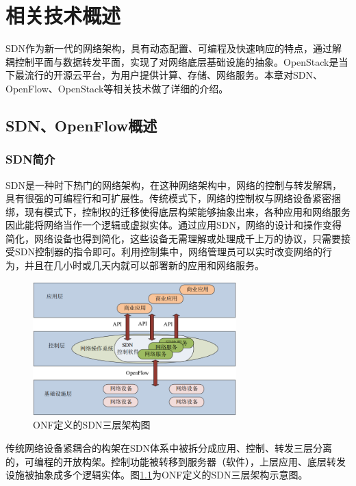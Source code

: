 
\chapter{相关技术概述}
SDN作为新一代的网络架构，具有动态配置、可编程及快速响应的特点，通过解耦控制平面与数据转发平面，实现了对网络底层基础设施的抽象。OpenStack是当下最流行的开源云平台，为用户提供计算、存储、网络服务。本章对SDN、OpenFlow、OpenStack等相关技术做了详细的介绍。
\section{SDN、OpenFlow概述}
\subsection{SDN简介}
SDN是一种时下热门的网络架构，在这种网络架构中，网络的控制与转发解耦，具有很强的可编程行和可扩展性。传统模式下，网络的控制权与网络设备紧密捆绑，现有模式下，控制权的迁移使得底层构架能够抽象出来，各种应用和网络服务因此能将网络当作一个逻辑或虚拟实体。通过应用SDN，网络的设计和操作变得简化，网络设备也得到简化，这些设备无需理解或处理成千上万的协议，只需要接受SDN控制器的指令即可。利用控制集中，网络管理员可以实时改变网络的行为，并且在几小时或几天内就可以部署新的应用和网络服务。

\begin{figure}[!htb]
  \centering
  \includegraphics[width=0.7\textwidth]{logo/sdn.png}
  \caption{ONF定义的SDN三层架构图}
  \label{fig:sdn}
\end{figure}

传统网络设备紧耦合的构架在SDN体系中被拆分成应用、控制、转发三层分离的，可编程的开放构架。控制功能被转移到服务器（软件），上层应用、底层转发设施被抽象成多个逻辑实体。图\ref{fig:sdn}为ONF定义的SDN三层架构示意图。

